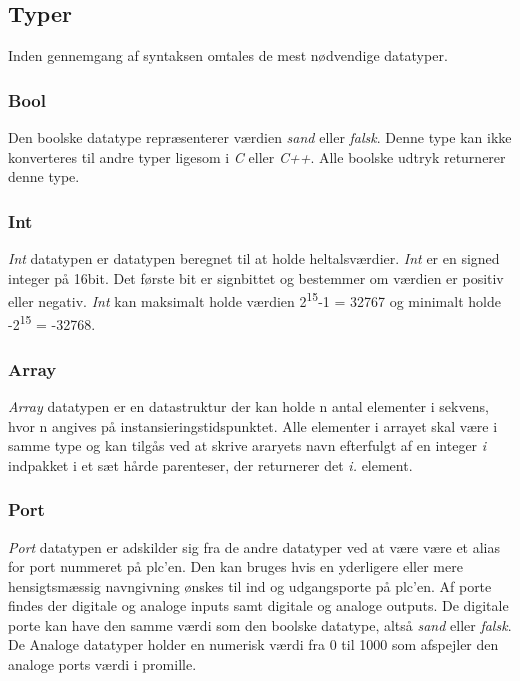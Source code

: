 \subsection{Typer}
Inden gennemgang af syntaksen omtales de mest nødvendige datatyper.

\subsubsection*{Bool}
Den boolske datatype repræsenterer værdien \textit{sand} eller \textit{falsk}. Denne type kan ikke konverteres til andre typer ligesom i \textit{C} eller \textit{C++}. Alle boolske udtryk returnerer denne type.

\subsubsection*{Int}
\textit{Int} datatypen er datatypen beregnet til at holde heltalsværdier. \textit{Int} er en signed integer på 16bit. Det første bit er signbittet og bestemmer om værdien er positiv eller negativ. \textit{Int} kan maksimalt holde værdien 2\textsuperscript{15}-1 = 32767 og minimalt holde -2\textsuperscript{15} = -32768.

\subsubsection*{Array}
\textit{Array} datatypen er en datastruktur der kan holde n antal elementer i sekvens, hvor n angives på instansieringstidspunktet. Alle elementer i arrayet skal være i samme type og kan tilgås ved at skrive araryets navn efterfulgt af en integer \textit{i} indpakket i et sæt hårde parenteser, der returnerer det \textit{i.} element.

\subsubsection*{Port}
\textit{Port} datatypen er adskilder sig fra de andre datatyper ved at være være et alias for port nummeret på \gls{plc}'en. Den kan bruges hvis en yderligere eller mere hensigtsmæssig navngivning ønskes til ind og udgangsporte på \gls{plc}'en.
Af porte findes der digitale og analoge inputs samt digitale og analoge outputs. De digitale porte kan have den samme værdi som den boolske datatype, altså \textit{sand} eller \textit{falsk}. De Analoge datatyper holder en numerisk værdi fra 0 til 1000 som afspejler den analoge ports værdi i promille.
